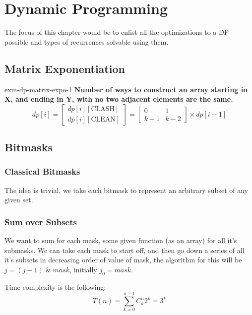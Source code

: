 \chapter{Dynamic Programming}

The focus of this chapter would be to enlist all the optimizations to a DP possible and types of recurrences solvable using them.



\section{Matrix Exponentiation}


\begin{example}{exm-dp-matrix-expo-1}
    \textbf{Number of ways to construct an array starting in X, and ending in Y, with no two adjacent elements are the same.}
    \begin{equation*}
        dp[i] = \begin{bmatrix} dp[i][\text{CLASH}] \\ dp[i][\text{CLEAN}] \end{bmatrix}
        = \begin{bmatrix} 0 & 1 \\ k-1 & k-2 \end{bmatrix} \times dp[i-1]
    \end{equation*}
\end{example}


\section{Bitmasks}


\subsection{Classical Bitmasks}

The idea is trivial, we take each bitmask to represent an arbitrary subset of any given set.


\subsection{Sum over Subsets}

We want to sum for each mask, some given function (as an array) for all it's submasks.
We can take each mask to start off, and then go down a series of all it's subsets in decreasing order of value of mask, the algorithm for this will be $j = (j - 1)\;\&\;mask$, initially $j_0 = mask$.

Time complexity is the following:
\begin{equation}
    T(n) = \sum_{k=0}^{n-1} C^n_k 2^k = 3^k
\end{equation}
